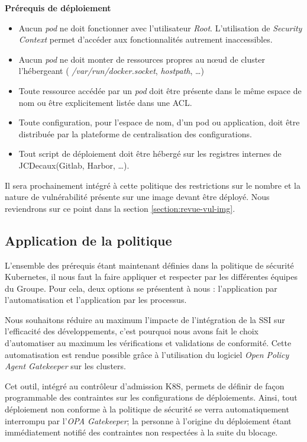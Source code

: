 \newpage

\textbf{Prérequis de déploiement}
\begin{itemize}
    \item Aucun \emph{pod} ne doit fonctionner avec l'utilisateur \emph{Root}. L'utilisation de \emph{Security Context} 
    permet d'accéder aux fonctionnalités autrement inaccessibles.
    \item Aucun \emph{pod} ne doit monter de ressources propres au nœud de cluster l'hébergeant (\ie 
    \emph{/var/run/docker.socket}, \emph{hostpath}, \dots)
    \item Toute ressource accédée par un \emph{pod} doit être présente dans le même espace de nom ou être explicitement 
    listée dans une \ac{ACL}.
    \item Toute configuration, pour l'espace de nom, d'un pod ou application, doit être distribuée par la plateforme de 
    centralisation des configurations.
    \item Tout script de déploiement doit être hébergé sur les registres internes de JCDecaux(\ie Gitlab, Harbor, \dots).
\end{itemize}

Il sera prochainement intégré à cette politique des restrictions sur le nombre et la nature de vulnérabilité présente 
sur une image devant être déployé. Nous reviendrons sur ce point dans la section \ref{section:revue-vul-img}.
\subsection{Application de la politique}
L'ensemble des prérequis étant maintenant définies dans la politique de sécurité Kubernetes, il nous faut la faire 
appliquer et respecter par les différentes équipes du Groupe.
\newline Pour cela, deux options se présentent à nous : l'application par l'automatisation et l'application par les
processus.

Nous souhaitons réduire au maximum l'impacte de l'intégration de la \ac{SSI} sur l'efficacité des développements, c'est 
pourquoi nous avons fait le choix d'automatiser au maximum les vérifications et validations de conformité.
\newline Cette automatisation est rendue possible grâce à l'utilisation du logiciel \emph{Open Policy Agent Gatekeeper}
sur les clusters.

Cet outil, intégré au contrôleur d'admission \ac{K8S}, permets de définir de façon programmable des contraintes sur les
configurations de déploiements. Ainsi, tout déploiement non conforme à la politique de sécurité se verra automatiquement 
interrompu par l'\emph{OPA Gatekeeper}; la personne à l'origine du déploiement étant immédiatement notifié des 
contraintes non respectées à la suite du blocage.

